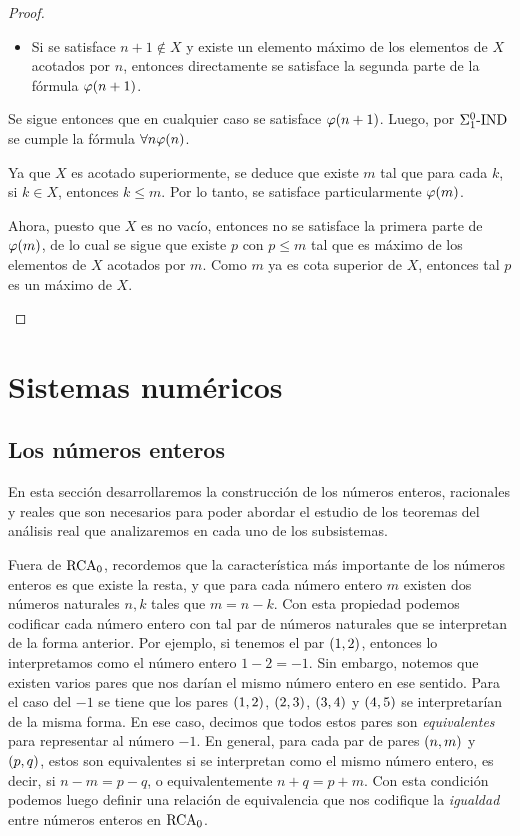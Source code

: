 \begin{proof}
\begin{enumerate}
\begin{itemize}
			\item Si se satisface $n + 1\notin X$ y existe un elemento máximo de los elementos de $X$ acotados por $n$, entonces directamente se satisface la segunda parte de la fórmula $\varphi\pa*{n + 1}$.
		\end{itemize}

		Se sigue entonces que en cualquier caso se satisface $\varphi\pa*{n + 1}$. Luego, por $\INDUCCION{\Sigma_{1}^{0}}$ se cumple la fórmula $\forall n\varphi\pa*{n}$.

		Ya que $X$ es acotado superiormente, se deduce que existe $m$ tal que para cada $k$, si $k\in X$, entonces $k\leq m$. Por lo tanto, se satisface particularmente $\varphi\pa*{m}$.

		Ahora, puesto que $X$ es no vacío, entonces no se satisface la primera parte de $\varphi\pa*{m}$, de lo cual se sigue que existe $p$ con $p\leq m$ tal que es máximo de los elementos de $X$ acotados por $m$. Como $m$ ya es cota superior de $X$, entonces tal $p$ es un máximo de $X$.
	\end{enumerate}
\end{proof}

\section{Sistemas numéricos}
\subsection{Los números enteros}
En esta sección desarrollaremos la construcción de los números enteros, racionales y reales que son necesarios para poder abordar el estudio de los teoremas del análisis real que analizaremos en cada uno de los subsistemas.

Fuera de $\RCA$, recordemos que la característica más importante de los números enteros es que existe la resta, y que para cada número entero $m$ existen dos números naturales $n, k$ tales que $m = n - k$. Con esta propiedad podemos codificar cada número entero con tal par de números naturales que se interpretan de la forma anterior. Por ejemplo, si tenemos el par $\pa*{1, 2}$, entonces lo interpretamos como el número entero $1 - 2 = -1$. Sin embargo, notemos que existen varios pares que nos darían el mismo número entero en ese sentido. Para el caso del $-1$ se tiene que los pares $\pa*{1, 2}$, $\pa*{2, 3}$, $\pa*{3, 4}$ y $\pa*{4, 5}$ se interpretarían de la misma forma. En ese caso, decimos que todos estos pares son \emph{equivalentes} para representar al número $-1$. En general, para cada par de pares $\pa*{n, m}$ y $\pa*{p, q}$, estos son equivalentes si se interpretan como el mismo número entero, es decir, si $n - m = p - q$, o equivalentemente $n + q = p + m$. Con esta condición podemos luego definir una relación de equivalencia que nos codifique la \emph{igualdad} entre números enteros en $\RCA$.

